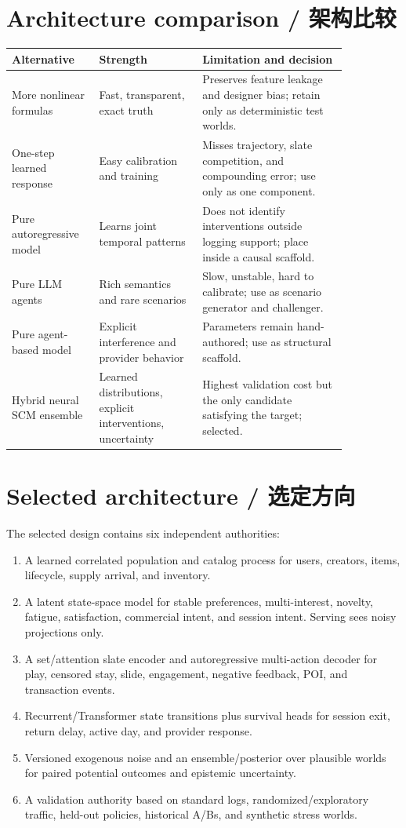 \documentclass[10.5pt,a4paper]{article}
\begin{document}
\section{Architecture comparison / 架构比较}

\begin{longtable}{p{0.20\linewidth}p{0.27\linewidth}p{0.38\linewidth}}
\toprule
Alternative & Strength & Limitation and decision \\
\midrule
More nonlinear formulas & Fast, transparent, exact truth & Preserves feature leakage and designer bias; retain only as deterministic test worlds. \\
One-step learned response & Easy calibration and training & Misses trajectory, slate competition, and compounding error; use only as one component. \\
Pure autoregressive model & Learns joint temporal patterns & Does not identify interventions outside logging support; place inside a causal scaffold. \\
Pure LLM agents & Rich semantics and rare scenarios & Slow, unstable, hard to calibrate; use as scenario generator and challenger. \\
Pure agent-based model & Explicit interference and provider behavior & Parameters remain hand-authored; use as structural scaffold. \\
Hybrid neural SCM ensemble & Learned distributions, explicit interventions, uncertainty & Highest validation cost but the only candidate satisfying the target; selected. \\
\bottomrule
\end{longtable}

\section{Selected architecture / 选定方向}

The selected design contains six independent authorities:

\begin{enumerate}
\item A learned correlated population and catalog process for users, creators, items, lifecycle, supply arrival, and inventory.
\item A latent state-space model for stable preferences, multi-interest, novelty, fatigue, satisfaction, commercial intent, and session intent. Serving sees noisy projections only.
\item A set/attention slate encoder and autoregressive multi-action decoder for play, censored stay, slide, engagement, negative feedback, POI, and transaction events.
\item Recurrent/Transformer state transitions plus survival heads for session exit, return delay, active day, and provider response.
\item Versioned exogenous noise and an ensemble/posterior over plausible worlds for paired potential outcomes and epistemic uncertainty.
\item A validation authority based on standard logs, randomized/exploratory traffic, held-out policies, historical A/Bs, and synthetic stress worlds.
\end{enumerate}
\end{document}

